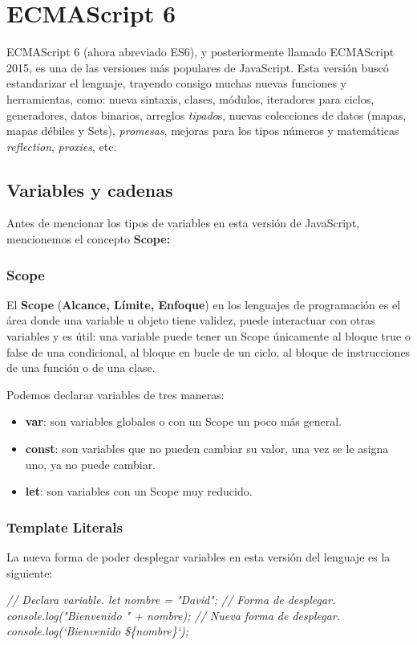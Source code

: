 \section{ECMAScript 6}
\hspace{0.55cm}ECMAScript 6 (ahora abreviado ES6), y posteriormente llamado ECMAScript 2015, es una de las versiones más populares de JavaScript. Esta versión buscó estandarizar el lenguaje, trayendo consigo muchas nuevas funciones y herramientas, como: nueva sintaxis, clases, módulos, iteradores para ciclos, generadores, datos binarios, arreglos \textit{tipado}s, nuevas colecciones de datos (mapas, mapas débiles y Sets), \textit{promesas}, mejoras para los tipos números y matemáticas \textit{reflection}, \textit{proxies}, etc.


\subsection{Variables y cadenas}
\hspace{0.55cm}Antes de mencionar los tipos de variables en esta versión de JavaScript, mencionemos el concepto \textbf{Scope:}


\subsubsection{Scope}
\hspace{0.55cm}El \textbf{Scope} (\textbf{Alcance, Límite, Enfoque}) en los lenguajes de programación es el área donde una variable u objeto tiene validez, puede interactuar con otras variables y es útil: una variable puede tener un Scope únicamente al bloque true o false de una condicional, al bloque en bucle de un ciclo, al bloque de instrucciones de una función o de una clase.

Podemos declarar variables de tres maneras:
\begin{itemize}
    \item \textbf{var}: son variables globales o con un Scope un poco más general.
    \item \textbf{const}: son variables que no pueden cambiar su valor, una vez se le asigna uno, ya no puede cambiar.
    \item \textbf{let}: son variables con un Scope muy reducido.
\end{itemize}

\subsubsection{Template Literals}
\hspace{0.55cm}La nueva forma de poder desplegar variables en esta versión del lenguaje es la siguiente:
\begin{center}
    \textit{
            // Declara variable.
            let nombre = "David";
            // Forma de desplegar.
            console.log("Bienvenido " + nombre);
            // Nueva forma de desplegar.
            console.log(`Bienvenido \$\{nombre\}`);
            }
\end{center}

